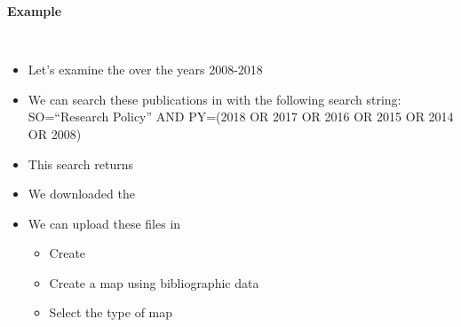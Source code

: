 \documentclass[8pt]{beamer}
\begin{document}

\begin{frame}
\frametitle{\insertsection}
\framesubtitle{Example}

\begin{columns}

\begin{itemize}
\item Let's examine the {\color{blue}{Research Policy's publications}} over the years 2008-2018
\item We can search these publications in {\color{blue}{Web of Science}} with the following search string: \\
	\medskip
	{\small SO=``Research Policy'' AND PY=(2018 OR 2017 OR 2016 OR 2015 OR 2014 OR 2008)}
	\medskip
\item This search returns {\color{blue}{1545 publications}} 
\item We downloaded the {\color{blue}{full records}}
\item We can upload these files in {\color{blue}{VOSviewer}}
	\begin{itemize}
	\item Create
	\item Create a map using bibliographic data
	\item Select the type of map
	\end{itemize}

\end{itemize}



\end{columns}
\end{frame}
\end{document}
